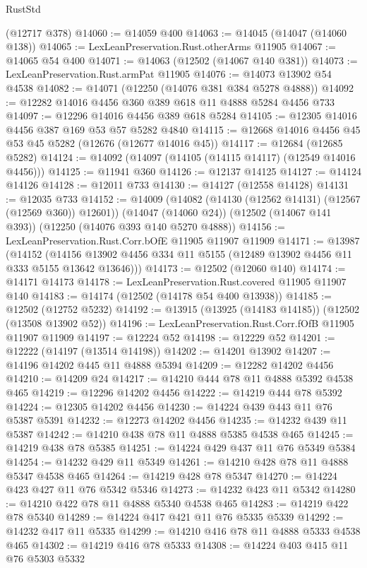 \begin{lexlean}{RustStd}
\begin{coremodule}
    (@12717 @378)
@14060 := @14059 @400
@14063 := @14045 (@14047 (@14060 @138))
@14065 := LexLeanPreservation.Rust.otherArms @11905
@14067 := @14065 @54 @400
@14071 := @14063 (@12502 (@14067 @140 @381))
@14073 := LexLeanPreservation.Rust.armPat @11905
@14076 := @14073 @13902 @54 @4538
@14082 := @14071 (@12250 (@14076 @381 @384 @5278 @4888))
@14092 := @12282 @14016 @4456 @360 @389 @618 @11 @4888 @5284 @4456 @733
@14097 := @12296 @14016 @4456 @389 @618 @5284
@14105 := @12305 @14016 @4456 @387 @169 @53 @57 @5282 @4840
@14115 := @12668 @14016 @4456 @45 @53 @45 @5282 (@12676 (@12677 @14016 @45))
@14117 := @12684 (@12685 @5282)
@14124 := @14092 (@14097 (@14105 (@14115 @14117) (@12549 @14016 @4456)))
@14125 := @11941 @360
@14126 := @12137 @14125
@14127 := @14124 @14126
@14128 := @12011 @733
@14130 := @14127 (@12558 @14128)
@14131 := @12035 @733
@14152 := @14009
    (@14082 (@14130 (@12562 @14131) (@12567 (@12569 @360)) @12601))
    (@14047 (@14060 @24))
    (@12502 (@14067 @141 @393))
    (@12250 (@14076 @393 @140 @5270 @4888))
@14156 := LexLeanPreservation.Rust.Corr.bOfE @11905 @11907 @11909
@14171 := @13987
    (@14152 (@14156 @13902 @4456 @334 @11 @5155 (@12489 @13902 @4456 @11 @333 @5155 @13642 @13646)))
@14173 := @12502 (@12060 @140)
@14174 := @14171 @14173
@14178 := LexLeanPreservation.Rust.covered @11905 @11907 @140
@14183 := @14174 (@12502 (@14178 @54 @400 @13938))
@14185 := @12502 (@12752 @5232)
@14192 := @13915 (@13925 (@14183 @14185)) (@12502 (@13508 @13902 @52))
@14196 := LexLeanPreservation.Rust.Corr.fOfB @11905 @11907 @11909
@14197 := @12224 @52
@14198 := @12229 @52
@14201 := @12222 (@14197 (@13514 @14198))
@14202 := @14201 @13902
@14207 := @14196 @14202 @445 @11 @4888 @5394
@14209 := @12282 @14202 @4456
@14210 := @14209 @24
@14217 := @14210 @444 @78 @11 @4888 @5392 @4538 @465
@14219 := @12296 @14202 @4456
@14222 := @14219 @444 @78 @5392
@14224 := @12305 @14202 @4456
@14230 := @14224 @439 @443 @11 @76 @5387 @5391
@14232 := @12273 @14202 @4456
@14235 := @14232 @439 @11 @5387
@14242 := @14210 @438 @78 @11 @4888 @5385 @4538 @465
@14245 := @14219 @438 @78 @5385
@14251 := @14224 @429 @437 @11 @76 @5349 @5384
@14254 := @14232 @429 @11 @5349
@14261 := @14210 @428 @78 @11 @4888 @5347 @4538 @465
@14264 := @14219 @428 @78 @5347
@14270 := @14224 @423 @427 @11 @76 @5342 @5346
@14273 := @14232 @423 @11 @5342
@14280 := @14210 @422 @78 @11 @4888 @5340 @4538 @465
@14283 := @14219 @422 @78 @5340
@14289 := @14224 @417 @421 @11 @76 @5335 @5339
@14292 := @14232 @417 @11 @5335
@14299 := @14210 @416 @78 @11 @4888 @5333 @4538 @465
@14302 := @14219 @416 @78 @5333
@14308 := @14224 @403 @415 @11 @76 @5303 @5332

\end{coremodule}
\end{lexlean}
